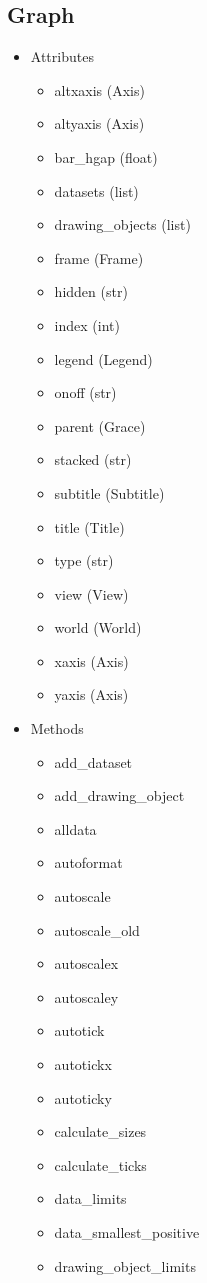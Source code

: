 \documentclass[10pt]{article}
\begin{document}
\begin{multicols}{4}
\subsection*{\footnotesize Graph}
\begin{itemize}
\item Attributes
\begin{itemize}
\item altxaxis (Axis)
\item altyaxis (Axis)
\item bar\_hgap (float)
\item datasets (list)
\item drawing\_objects (list)
\item frame (Frame)
\item hidden (str)
\item index (int)
\item legend (Legend)
\item onoff (str)
\item parent (Grace)
\item stacked (str)
\item subtitle (Subtitle)
\item title (Title)
\item type (str)
\item view (View)
\item world (World)
\item xaxis (Axis)
\item yaxis (Axis)
\end{itemize}
\item Methods
\begin{itemize}
\item add\_dataset
\item add\_drawing\_object
\item alldata
\item autoformat
\item autoscale
\item autoscale\_old
\item autoscalex
\item autoscaley
\item autotick
\item autotickx
\item autoticky
\item calculate\_sizes
\item calculate\_ticks
\item data\_limits
\item data\_smallest\_positive
\item drawing\_object\_limits

\end{itemize}
\end{itemize}
\end{multicols}
\end{document}
